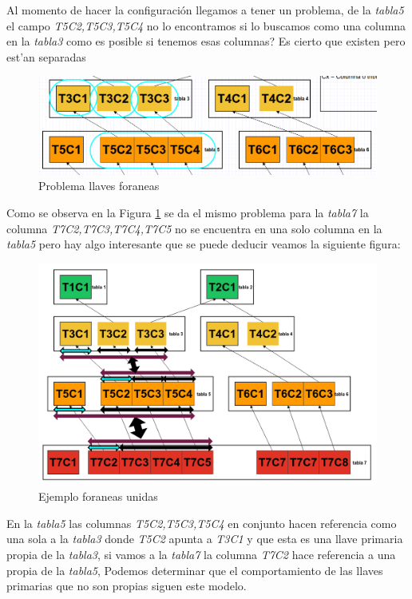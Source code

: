 Al momento de hacer la configuraci\'on llegamos a tener un problema, de la \textit{tabla5} el campo  \textit{T5C2,T5C3,T5C4} no lo encontramos si lo buscamos como una columna en la \textit{tabla3} como es posible si tenemos esas columnas? Es cierto que existen pero est'an separadas
\begin{figure}[H]
\centering
\includegraphics[scale=0.4]{images/problemaColumnas.png}
\caption{Problema llaves foraneas}\label{fig:problemaColumnasForaneasLine}
\end{figure}
Como se observa en la Figura \ref{fig:problemaColumnasForaneasLine} se da el mismo problema para la \textit{tabla7} la columna \textit{T7C2,T7C3,T7C4,T7C5} no se encuentra en una solo columna en la \textit{tabla5} pero hay algo interesante que se puede deducir veamos la siguiente figura:
\begin{figure}[H]
\centering
\includegraphics[scale=0.3]{images/problemaForaneas.png}
\caption{Ejemplo foraneas unidas}\label{fig:problemaColumnasForaneasGrafica}
\end{figure}
En la \textit{tabla5} las columnas \textit{T5C2,T5C3,T5C4} en conjunto hacen referencia como una sola a la \textit{tabla3} donde \textit{T5C2} apunta a \textit{T3C1} y que esta es una llave primaria propia de la \textit{tabla3}, si vamos a la \textit{tabla7} la columna  \textit{T7C2} hace referencia a una propia de la \textit{tabla5}, Podemos determinar que el comportamiento de las llaves primarias que no son propias siguen este modelo.
